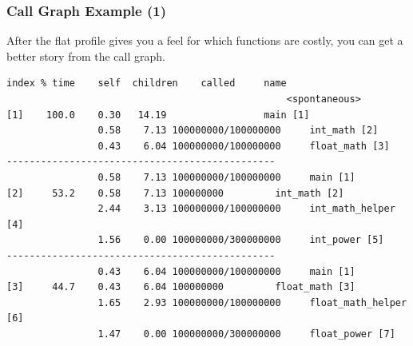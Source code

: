 \documentclass[aspectratio=43]{beamer}
\newenvironment{changemargin}[1]{%
  \begin{list}{}{%
    \setlength{\topsep}{0pt}%
    \setlength{\leftmargin}{#1}%
    \setlength{\rightmargin}{1em}
    \setlength{\listparindent}{\parindent}%
    \setlength{\itemindent}{\parindent}%
    \setlength{\parsep}{\parskip}%
  }%
  \item[]}{\end{list}}
\begin{document}
\begin{frame}[fragile]
  \frametitle{Call Graph Example (1)}

  \begin{changemargin}{1cm}
    After the flat profile gives you a feel for which functions are costly, you
      can get a better story from the call graph.
  \vfill
  \begin{lstlisting}[basicstyle=\tiny]
index % time    self  children    called     name
                                                 <spontaneous>
[1]    100.0    0.30   14.19                 main [1]
                0.58    7.13 100000000/100000000     int_math [2]
                0.43    6.04 100000000/100000000     float_math [3]
-----------------------------------------------
                0.58    7.13 100000000/100000000     main [1]
[2]     53.2    0.58    7.13 100000000         int_math [2]
                2.44    3.13 100000000/100000000     int_math_helper [4]
                1.56    0.00 100000000/300000000     int_power [5]
-----------------------------------------------
                0.43    6.04 100000000/100000000     main [1]
[3]     44.7    0.43    6.04 100000000         float_math [3]
                1.65    2.93 100000000/100000000     float_math_helper [6]
                1.47    0.00 100000000/300000000     float_power [7]
  \end{lstlisting}
  \end{changemargin}
\end{frame}
\end{document}
